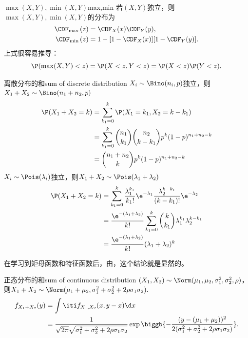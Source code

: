 \begin{example}{$\max(X,Y),\min(X,Y)$}{max,min}
	若$(X,Y)$独立，则$\max(X,Y),\min(X,Y)$的分布为
	\begin{subequations}
		\label{eqn:min-max distribution}
		\begin{align}
			\CDF_{\max{}}(z)&=\CDF_X(x)\CDF_Y(y),\\
			\CDF_{\min{}}(z)&=1-[1-\CDF_X(x)][1-\CDF_Y(y)].
		\end{align}
	\end{subequations}
	上式很容易推导：
	\[
		\P(\max(X,Y)<z)=\P(X<z,Y<z)=\P(X<z)\P(Y<z),
	\]
\end{example}
\begin{example}{离散分布的和}{sum of discrete distribution}
	$X_i\sim\Bino(n_i,p)$独立，则$X_1+X_2\sim\Bino(n_1+n_2,p)$
	\begin{align*}
		\P(X_1+X_2=k)&=\sum_{k_1=0}^k\P(X_1=k_1,X_2=k-k_1)\\
		&=\sum_{k_1=0}^k\binom{n_1}{k_1}\binom{n_2}{k-k_1}p^k(1-p)^{n_1+n_2-k}\\
		&=\binom{n_1+n_2}{k}p^k(1-p)^{n_1+n_2-k}
	\end{align*}
	\tcblower
	$X_i\sim\Pois(\lambda_i)$独立，则$X_1+X_2\sim\Pois(\lambda_1+\lambda_2)$
	\begin{align*}
		\P(X_1+X_2=k)&=\sum_{k_1=0}^k\frac{\lambda_1^{k_1}}{k_1!}\e^{-\lambda_1}\frac{\lambda_2^{k-k_1}}{(k-k_1)!}\e^{-\lambda_2}\\
		&=\frac{\e^{-(\lambda_1+\lambda_2)}}{k!}\sum_{k_1=0}^k\binom{k}{k_1}\lambda_1^{k_1}\lambda_2^{k-k_1}\\
		&=\frac{\e^{-(\lambda_1+\lambda_2)}}{k!}(\lambda_1+\lambda_2)^k
	\end{align*}
\end{example}
\begin{remark}
	在学习到矩母函数和特征函数后，由，这个结论就是显然的。
\end{remark}
\begin{example}{正态分布的和}{sum of continuous distribution}
	$(X_1,X_2)\sim\Norm(\mu_1,\mu_2,\sigma_1^2,\sigma_2^2,\rho)$，则$X_1+X_2\sim\Norm(\mu_1+\mu_2,\sigma_1^2+\sigma_2^2+2\rho\sigma_1\sigma_2).$
	\begin{align*}
		f_{X_1+X_2}(y)&=\int\iti f_{X_1,X_2}(x,y-x)\d x\\
		&=\frac1{\sqrt{2\pi}\sqrt{\sigma_1^2+\sigma_2^2+2\rho\sigma_1\sigma_2}}\exp\biggb{-\frac{(y-(\mu_1+\mu_2))^2}{2(\sigma_1^2+\sigma_2^2+2\rho\sigma_1\sigma_2)}}.
	\end{align*}
\end{example}
